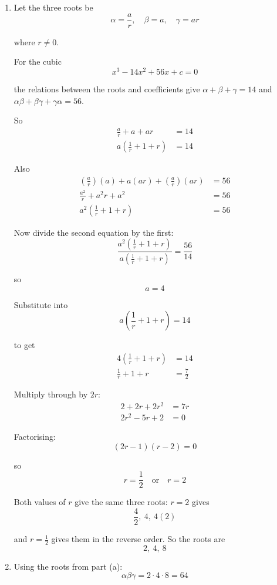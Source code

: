 \documentclass[leqno]{article}
\begin{document}
\begin{enumerate}[
  label=\textbf{\arabic*.},
  leftmargin=*,
  topsep=0pt,
  partopsep=0pt,
  parsep=0pt
]
\vspace*{10pt}

\begin{djsSolution}
\begin{enumerate}[label=\textbf{(\alph*)}]
\item Let the three roots be
\[
\alpha=\frac{a}{r},\quad \beta=a,\quad \gamma=ar
\]

where $r\neq 0$.

For the cubic
\[
x^3-14x^2+56x+c=0
\]

the relations between the roots and coefficients give \(\alpha+\beta+\gamma=14\) and \(\alpha\beta+\beta\gamma+\gamma\alpha=56\).

So
\begin{align*}
\frac{a}{r}+a+ar&=14 \\
a\left(\frac1r+1+r\right)&=14
\end{align*}

Also
\begin{align*}
\left(\frac{a}{r}\right)(a)+a(ar)+\left(\frac{a}{r}\right)(ar)&=56 \\
\frac{a^2}{r}+a^2r+a^2&=56 \\
a^2\left(\frac1r+1+r\right)&=56
\end{align*}

Now divide the second equation by the first:
\[
\frac{a^2\left(\frac1r+1+r\right)}{a\left(\frac1r+1+r\right)}=\frac{56}{14}
\]

so
\[
a=4
\]

Substitute into
\[
a\left(\frac1r+1+r\right)=14
\]

to get
\begin{align*}
4\left(\frac1r+1+r\right)&=14 \\
\frac1r+1+r&=\frac72
\end{align*}

Multiply through by $2r$:
\begin{align*}
2+2r+2r^2&=7r \\
2r^2-5r+2&=0
\end{align*}

Factorising:
\[
(2r-1)(r-2)=0
\]

so
\[
r=\frac12 \quad \text{or} \quad r=2
\]

Both values of $r$ give the same three roots: $r=2$ gives
\[
\frac{4}{2},\ 4,\ 4(2)
\]

and $r=\frac12$ gives them in the reverse order. So the roots are
\[
2,\ 4,\ 8
\]

\item Using the roots from part (a):
\[
\alpha\beta\gamma=2\cdot 4\cdot 8=64
\]


\end{enumerate}
\end{djsSolution}
\end{enumerate}
\end{document}
